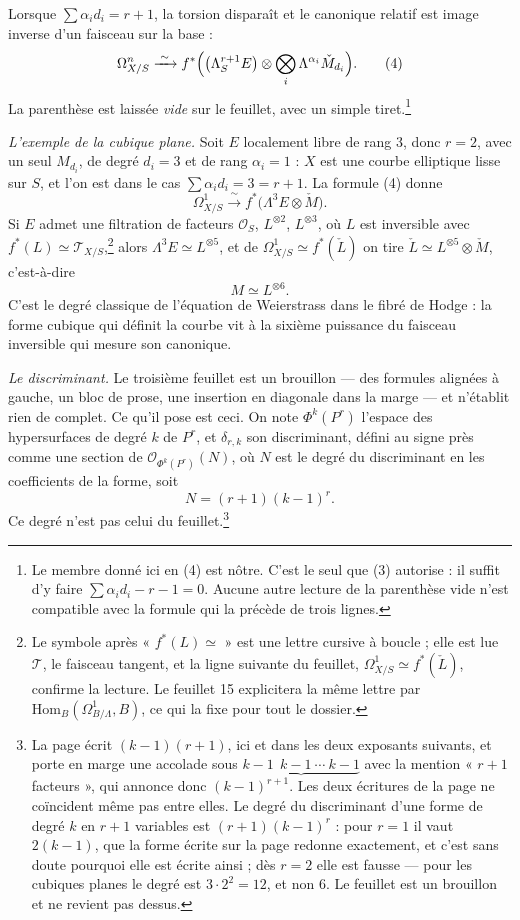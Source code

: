 \documentclass[11pt,a4paper]{article}
\begin{document}
Lorsque $\sum \alpha_i d_i = r+1$, la torsion disparaît et le canonique relatif
est image inverse d'un faisceau sur la base :
\[
  \Omega^{n}_{X/S} \xrightarrow{\;\sim\;}
  f^{*}\Bigl(\bigl(\Lambda^{r+1}_{S} E\bigr) \otimes
  \bigotimes_{i} \Lambda^{\alpha_i} \check{M}_{d_i}\Bigr) .
\tag{4}
\]
La parenthèse est laissée \emph{vide} sur le feuillet, avec un simple
tiret.\footnote{Le membre donné ici en (4) est nôtre. C'est le seul que (3)
autorise : il suffit d'y faire $\sum\alpha_i d_i - r - 1 = 0$. Aucune autre
lecture de la parenthèse vide n'est compatible avec la formule qui la précède
de trois lignes.}

\emph{L'exemple de la cubique plane.} Soit $E$ localement libre de rang $3$,
donc $r = 2$, avec un seul $M_{d_i}$, de degré $d_i = 3$ et de rang
$\alpha_i = 1$ : $X$ est une courbe elliptique lisse sur $S$, et l'on est dans
le cas $\sum \alpha_i d_i = 3 = r+1$. La formule (4) donne
\[
  \Omega^{1}_{X/S} \xrightarrow{\;\sim\;} f^{*}\bigl(\Lambda^{3} E \otimes
  \check{M}\bigr) .
\]
Si $E$ admet une filtration de facteurs $\mathcal{O}_S$, $L^{\otimes 2}$,
$L^{\otimes 3}$, où $L$ est inversible avec $f^{*}(L) \simeq
\mathcal{T}_{X/S}$,\footnote{Le symbole après « $f^{*}(L) \simeq$ » est une
lettre cursive à boucle ; elle est lue $\mathcal{T}$, le faisceau tangent, et la
ligne suivante du feuillet, $\Omega^{1}_{X/S} \simeq f^{*}(\check{L})$, confirme
la lecture. Le feuillet 15 explicitera la même lettre par
$\mathrm{Hom}_{B}(\Omega^{1}_{B/\Lambda}, B)$, ce qui la fixe pour tout le
dossier.} alors $\Lambda^{3} E \simeq L^{\otimes 5}$, et de
$\Omega^{1}_{X/S} \simeq f^{*}(\check{L})$ on tire $\check{L} \simeq
L^{\otimes 5} \otimes \check{M}$, c'est-à-dire
\[
  M \simeq L^{\otimes 6} .
\]
C'est le degré classique de l'équation de Weierstrass dans le fibré de Hodge :
la forme cubique qui définit la courbe vit à la sixième puissance du faisceau
inversible qui mesure son canonique.

\emph{Le discriminant.} Le troisième feuillet est un brouillon — des formules
alignées à gauche, un bloc de prose, une insertion en diagonale dans la marge —
et n'établit rien de complet. Ce qu'il pose est ceci. On note $\Phi^{k}(P^{r})$
l'espace des hypersurfaces de degré $k$ de $P^{r}$, et $\delta_{r,k}$ son
discriminant, défini au signe près comme une section de
$\mathcal{O}_{\Phi^{k}(P^{r})}(N)$, où $N$ est le degré du discriminant en les
coefficients de la forme, soit
\[
  N = (r+1)(k-1)^{r} .
\]
Ce degré n'est pas celui du feuillet.\footnote{La page écrit $(k-1)(r+1)$, ici
et dans les deux exposants suivants, et porte en marge une accolade sous
$\underbrace{k-1 \ \ k-1 \ \cdots \ k-1}$ avec la mention « $r+1$ facteurs »,
qui annonce donc $(k-1)^{r+1}$. Les deux écritures de la page ne coïncident
même pas entre elles. Le degré du discriminant d'une forme de degré $k$ en
$r+1$ variables est $(r+1)(k-1)^{r}$ : pour $r = 1$ il vaut $2(k-1)$, que la
forme écrite sur la page redonne exactement, et c'est sans doute pourquoi elle
est écrite ainsi ; dès $r = 2$ elle est fausse — pour les cubiques planes le
degré est $3 \cdot 2^{2} = 12$, et non $6$. Le feuillet est un brouillon et ne
revient pas dessus.}
\end{document}
